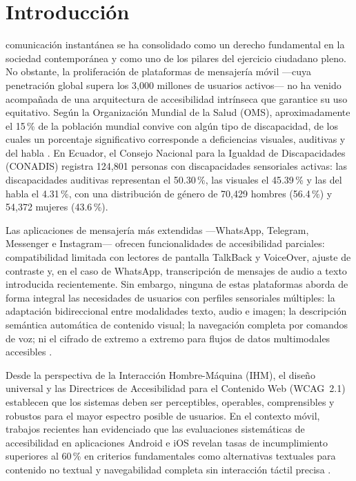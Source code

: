 \documentclass[journal]{IEEEtran}
\begin{document}
	\section{Introducci\'on}
		 comunicaci\'on instant\'anea se ha consolidado como un derecho fundamental en la sociedad contempor\'anea y como uno de los pilares del ejercicio ciudadano pleno. No obstante, la proliferaci\'on de plataformas de mensajer\'ia m\'ovil ---cuya penetraci\'on global supera los 3{,}000 millones de usuarios activos--- no ha venido acompa\~nada de una arquitectura de accesibilidad intr\'inseca que garantice su uso equitativo. Seg\'un la Organizaci\'on Mundial de la Salud (OMS), aproximadamente el 15\,\% de la poblaci\'on mundial convive con alg\'un tipo de discapacidad, de los cuales un porcentaje significativo corresponde a deficiencias visuales, auditivas y del habla \cite{who2011}. En Ecuador, el Consejo Nacional para la Igualdad de Discapacidades (CONADIS) registra 124{,}801 personas con discapacidades sensoriales activas: las discapacidades auditivas representan el 50.30\,\%, las visuales el 45.39\,\% y las del habla el 4.31\,\%, con una distribuci\'on de g\'enero de 70{,}429 hombres (56.4\,\%) y 54{,}372 mujeres (43.6\,\%).
		
		Las aplicaciones de mensajer\'ia m\'as extendidas ---WhatsApp, Telegram, Messenger e Instagram--- ofrecen funcionalidades de accesibilidad parciales: compatibilidad limitada con lectores de pantalla TalkBack y VoiceOver, ajuste de contraste y, en el caso de WhatsApp, transcripci\'on de mensajes de audio a texto introducida recientemente. Sin embargo, ninguna de estas plataformas aborda de forma integral las necesidades de usuarios con perfiles sensoriales m\'ultiples: la adaptaci\'on bidireccional entre modalidades texto, audio e imagen; la descripci\'on sem\'antica autom\'atica de contenido visual; la navegaci\'on completa por comandos de voz; ni el cifrado de extremo a extremo para flujos de datos multimodales accesibles \cite{bercaru2024, weichbroth2020}.
		
		Desde la perspectiva de la Interacci\'on Hombre-M\'aquina (IHM), el dise\~no universal \cite{story1998} y las Directrices de Accesibilidad para el Contenido Web (WCAG~2.1) \cite{w3c2018} establecen que los sistemas deben ser perceptibles, operables, comprensibles y robustos para el mayor espectro posible de usuarios. En el contexto m\'ovil, trabajos recientes han evidenciado que las evaluaciones sistem\'aticas de accesibilidad en aplicaciones Android e iOS revelan tasas de incumplimiento superiores al 60\,\% en criterios fundamentales como alternativas textuales para contenido no textual y navegabilidad completa sin interacci\'on t\'actil precisa \cite{chen2022, acosta2020}.
		
\end{document}
